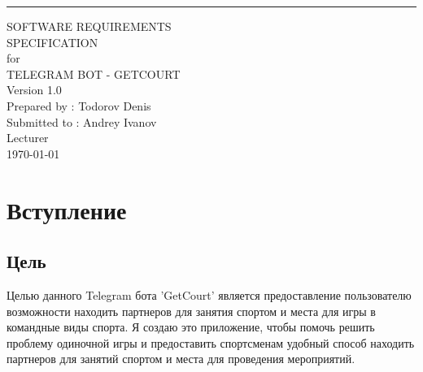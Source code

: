 \documentclass{scrreprt}
\date{}
\def\myversion{1.0 }
\begin{document}
\begin{flushright}
    \rule{16cm}{5pt}\vskip1cm
    \begin{bfseries}
        \Huge{SOFTWARE REQUIREMENTS\\ SPECIFICATION}\\
        \vspace{1.5cm}
        for\\
        \vspace{1.5cm}
        TELEGRAM BOT - GETCOURT\\
        \vspace{1.5cm}
        \LARGE{Version \myversion}\\
        \vspace{1.5cm}
        Prepared by : Todorov Denis\\
        \vspace{1.5cm}
        Submitted to : Andrey Ivanov \\Lecturer\\
        \vspace{1.5cm}
        \today\\
    \end{bfseries}
\end{flushright}

\tableofcontents

\chapter{Вступление}

\section{Цель}
Целью данного Telegram бота 'GetCourt' является предоставление пользователю возможности находить партнеров для занятия спортом и места для игры в командные виды спорта. Я создаю это приложение, чтобы помочь решить проблему одиночной игры и предоставить спортсменам удобный способ находить партнеров для занятий спортом и места для проведения мероприятий.
\end{document}
